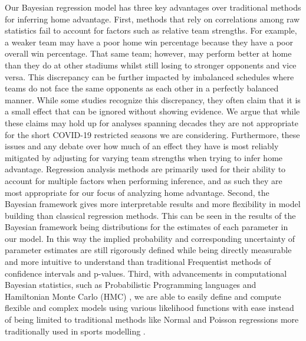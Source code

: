 Our Bayesian regression model has three key advantages over traditional methods for inferring home advantage. First, methods that rely on correlations among raw statistics fail to account for factors such as relative team strengths. For example, a weaker team may have a poor home win percentage because they have a poor overall win percentage. That same team; however, may perform better at home than they do at other stadiums whilst still losing to stronger opponents and vice versa. This discrepancy can be further impacted by imbalanced schedules where teams do not face the same opponents as each other in a perfectly balanced manner. While some studies recognize this discrepancy, they often claim that it is a small effect that can be ignored \cite{Pollard2005a} without showing evidence. We argue that while these claims may hold up for analyses spanning decades they are not appropriate for the short COVID-19 restricted seasons we are considering. Furthermore, these issues and any debate over how much of an effect they have is most reliably mitigated by adjusting for varying team strengths when trying to infer home advantage. Regression analysis methods are primarily used for their ability to account for multiple factors when performing inference, and as such they are most appropriate for our focus of analyzing home advantage. Second, the Bayesian framework gives more interpretable results and more flexibility in model building than classical regression methods. This can be seen in the results of the Bayesian framework being distributions for the estimates of each parameter in our model. In this way the implied probability and corresponding uncertainty of parameter estimates are still rigorously defined while being directly measurable and more intuitive to understand than traditional Frequentist methods of confidence intervals and p-values. Third, with advancements in computational Bayesian statistics, such as Probabilistic Programming languages \cite{pymc3} and Hamiltonian Monte Carlo (HMC) \cite{Betancourt2017}, we are able to easily define and compute flexible and complex models using various likelihood functions with ease instead of being limited to traditional methods like Normal and Poisson regressions more traditionally used in sports modelling \cite{Lopez2018} \cite{Glickman1998} \cite{Karlis2003} \cite{Baio2010} \cite{Benz2020}.


